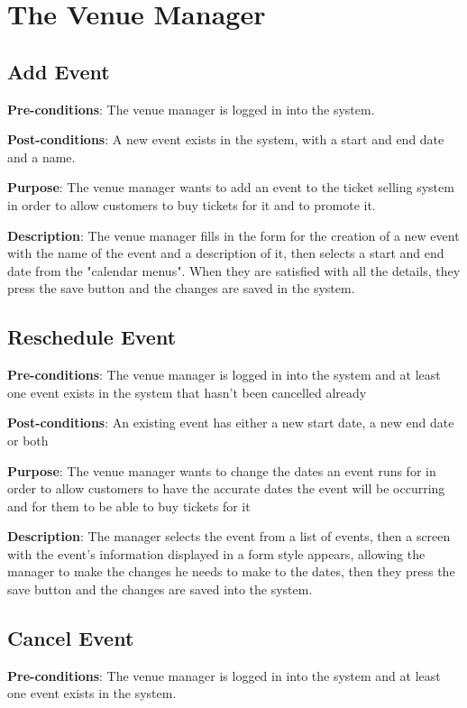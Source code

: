\section{The Venue Manager}

\subsection{Add Event}
\textbf{Pre-conditions}: The venue manager is logged in into the system.

\textbf{Post-conditions}: A new event exists in the system, with a start and end date and a name.

\textbf{Purpose}: The venue manager wants to add an event to the ticket selling system in order to allow customers to buy tickets for it and to promote it.

\textbf{Description}: The venue manager fills in the form for the creation of a new event with the name of the event and a description of it, then selects a start and end date from the "calendar menus". When they are satisfied with all the details, they press the save button and the changes are saved in the system.

\subsection{Reschedule Event}
\textbf{Pre-conditions}: The venue manager is logged in into the system and at least one event exists in the system that hasn't been cancelled already

\textbf{Post-conditions}: An existing event has either a new start date, a new end date or both

\textbf{Purpose}: The venue manager wants to change the dates an event runs for in order to allow customers to have the accurate dates the event will be occurring and for them to be able to buy tickets for it

\textbf{Description}: The manager selects the event from a list of events, then a screen with the event's information displayed in a form style appears, allowing the manager to make the changes he needs to make to the dates, then they press the save button and the changes are saved into the system.

\subsection{Cancel Event}
\textbf{Pre-conditions}: The venue manager is logged in into the system and at least one event exists in the system.

